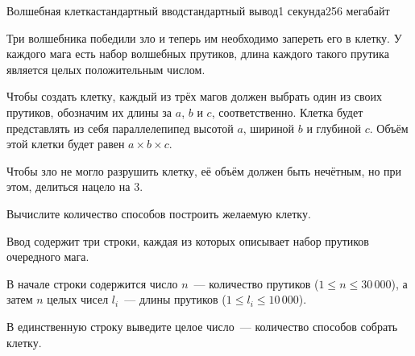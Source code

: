 \begin{problem}{Волшебная клетка}{стандартный ввод}{стандартный вывод}{1 секунда}{256 мегабайт}

Три волшебника победили зло и теперь им необходимо запереть его в клетку. У каждого мага есть набор волшебных прутиков, длина каждого такого прутика является целых положительным числом.

Чтобы создать клетку, каждый из трёх магов должен выбрать один из своих прутиков, обозначим их длины за $a$, $b$ и $c$, соответственно. Клетка будет представлять из себя параллелепипед высотой $a$, шириной $b$ и глубиной $c$. Объём этой клетки будет равен $a \times b \times c$.

Чтобы зло не могло разрушить клетку, её объём должен быть нечётным, но при этом, делиться нацело на 3.

Вычислите количество способов построить желаемую клетку.

\InputFile
Ввод содержит три строки, каждая из которых описывает набор прутиков очередного мага.

В начале строки содержится число $n$~--- количество прутиков ($1 \leq n \leq 30\,000$), а затем $n$ целых чисел $l_{i}$~--- длины прутиков ($1 \leq l_{i} \leq 10\,000$).

\OutputFile
В единственную строку выведите целое число~--- количество способов собрать клетку.

\Examples

\begin{example}
%
%
\end{example}

\end{problem}

